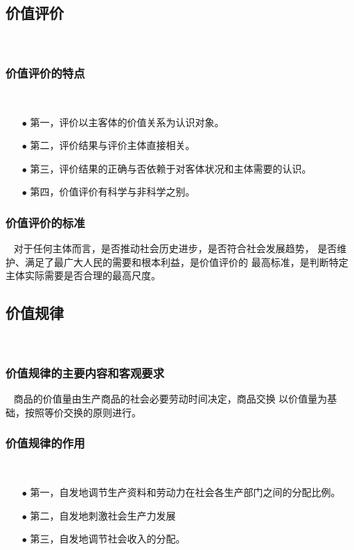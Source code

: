 \documentclass{ctexart}
\begin{document}
\subsection{价值评价}~{}
\vspace{-5mm}

\subsubsection{价值评价的特点}~{}
\vspace{-5mm}
\begin{itemize}
\item[$\bullet$]第一，评价以主客体的价值关系为认识对象。
\item[$\bullet$]第二，评价结果与评价主体直接相关。
\item[$\bullet$]第三，评价结果的正确与否依赖于对客体状况和主体需要的认识。
\item[$\bullet$]第四，价值评价有科学与非科学之别。  
\end{itemize}

\subsubsection{价值评价的标准}~{}
对于任何主体而言，是否推动社会历史进步，是否符合社会发展趋势，
是否维护、满足了最广大人民的需要和根本利益，是价值评价的
最高标准，是判断特定主体实际需要是否合理的最高尺度。
\vspace{+10mm}
\subsection{价值规律}~{}
\vspace{-5mm}

\subsubsection{价值规律的主要内容和客观要求}~{}
商品的价值量由生产商品的社会必要劳动时间决定，商品交换
以价值量为基础，按照等价交换的原则进行。
\subsubsection{价值规律的作用}~{}
\vspace{-5mm}
\begin{itemize}
\item[$\bullet$]第一，自发地调节生产资料和劳动力在社会各生产部门之间的分配比例。
\item[$\bullet$]第二，自发地刺激社会生产力发展
\item[$\bullet$]第三，自发地调节社会收入的分配。
\end{itemize}
\end{document}
